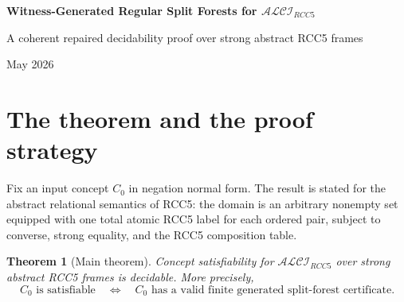 \documentclass[11pt]{article}
\newtheorem{theorem}[definition]{Theorem}
\theoremstyle{remark}
\newcommand{\Logic}{\mathcal{ALCI}_{RCC5}}
\newcommand{\PP}{\mathsf{PP}}
\newcommand{\PPI}{\mathsf{PPI}}
\newcommand{\EQ}{\mathsf{EQ}}
\begin{document}
\begin{center}
{\LARGE\bfseries Witness-Generated Regular Split Forests for $\mathcal{ALCI}_{RCC5}$\par}
\vspace{0.6em}
{\large A coherent repaired decidability proof over strong abstract RCC5 frames\par}
\vspace{0.4em}
{\small May 2026}\par
\end{center}

\begin{abstract}
We prove decidability of concept satisfiability for $\mathcal{ALCI}_{RCC5}$ over strong abstract complete atomic RCC5 frames.  The proof uses the original split-forest idea in a generated form.  First, every satisfiable concept has a witness-generated induced submodel: only selected witnesses for existential closure formulas are retained.  Thus the cover edges used later are generated witness-cover edges, not Hasse covers of an arbitrary semantic proper-part order.  Second, the witness-generated model is represented by a containment-oriented split forest.  Vertical branches carry $\PP/\PPI$ by transitive closure; weak-$\EQ$ split copies repair multiple selected containment parents; nonvertical interaction is recorded by finite support-closed mosaics.  Third, finite regular certificates are checked by local type conditions, the correct RCC5 composition table, exact reachability summaries for transitive $\PP/\PPI$ eventualities, context-specific support, and an explicit typed-$\EQ$ congruence.  Blocking cycles in a certificate unfold to fresh semantic occurrences and are never semantic equality cycles.  The existence of a valid finite certificate is effectively decidable, and it is equivalent to satisfiability.
\end{abstract}

\tableofcontents

\section{The theorem and the proof strategy}
Fix an input concept $C_0$ in negation normal form.  The result is stated for the abstract relational semantics of RCC5: the domain is an arbitrary nonempty set equipped with one total atomic RCC5 label for each ordered pair, subject to converse, strong equality, and the RCC5 composition table.

\begin{theorem}[Main theorem]\label{thm:main}
Concept satisfiability for $\Logic$ over strong abstract RCC5 frames is decidable.  More precisely,
\[
C_0 \text{ is satisfiable}
\quad\Longleftrightarrow\quad
C_0 \text{ has a valid finite generated split-forest certificate}.
\]
\end{theorem}
\end{document}
